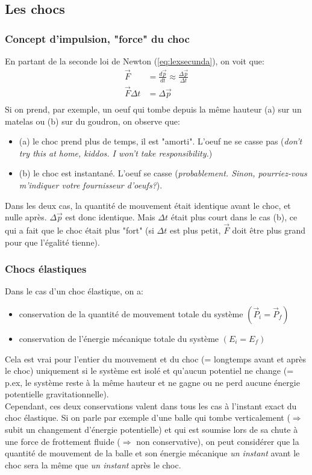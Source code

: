 \documentclass{article}
\numberwithin{equation}{section}
\begin{document}
\subsection{Les chocs}

\subsubsection{Concept d'impulsion, "force" du choc}
En partant de la seconde loi de Newton (\ref{eq:lexsecunda}), on voit que:
\begin{align*}
	\vec F 			&= \frac{d \vec p}{dt} \approx \frac{\Delta \vec p}{\Delta t} \\
	\vec F \Delta t 	&= \Delta \vec p \\
\end{align*}
Si on prend, par exemple, un oeuf qui tombe depuis la même hauteur (a) sur un matelas ou (b) sur du goudron, on observe que:
\begin{itemize}
	\item (a) le choc prend plus de temps, il est "amorti". L'oeuf ne se casse pas (\emph{don't try this at home, kiddos. I won't take responsibility.})
	\item (b) le choc est instantané. L'oeuf se casse (\emph{probablement. Sinon, pourriez-vous m'indiquer votre fournisseur d'oeufs?}).
\end{itemize}
Dans les deux cas, la quantité de mouvement était identique avant le choc, et nulle après. \(\Delta \vec p\) est donc identique. Mais \(\Delta t\) était plus court dans le cas (b), ce qui a fait que le choc était plus "fort" (si \(\Delta t\) est plus petit, \(\vec F\) doit être plus grand pour que l'égalité tienne).

\subsubsection{Chocs élastiques}
Dans le cas d'un choc élastique, on a:
\begin{itemize}
	\item conservation de la quantité de mouvement totale du système \((\vec P_i = \vec P_f)\)
	\item conservation de l'énergie mécanique totale du système \((E_i = E_f)\)
\end{itemize}
Cela est vrai pour l'entier du mouvement et du choc (= longtemps avant et après le choc) uniquement si le système est isolé et qu'aucun potentiel ne change (= p.ex, le système reste à la même hauteur et ne gagne ou ne perd aucune énergie potentielle gravitationnelle). \\
Cependant, ces deux conservations valent dans tous les cas à l'instant exact du choc élastique. Si on parle par exemple d'une balle qui tombe verticalement (\(\Rightarrow\) subit un changement d'énergie potentielle) et qui est soumise lors de sa chute à une force de frottement fluide (\(\Rightarrow\) non conservative), on peut considérer que la quantité de mouvement de la balle et son énergie mécanique \emph{un instant} avant le choc sera la même que \emph{un instant} après le choc. 
\end{document}
